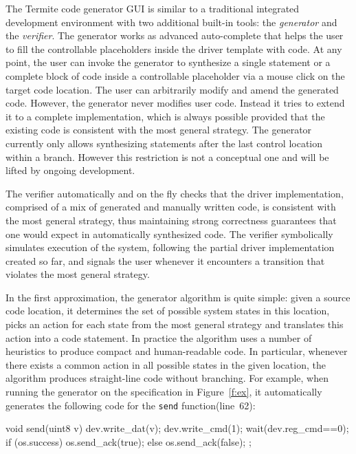 \documentclass[a4paper,twoside,openright,11pt]{book}
\newcommand{\termite}{Termite\xspace}
\theoremstyle{definition}
\newcommand{\src}[1]{\texttt{\small #1}}
\begin{document}
The \termite code generator GUI is similar to a traditional integrated development environment with two additional built-in tools: the \emph{generator} and the \emph{verifier}.  The generator works as advanced auto-complete that helps the user to fill the controllable placeholders inside the driver template with code.  At any point, the user can invoke the generator to synthesize a single statement or a complete block of code inside a controllable placeholder via a mouse click on the target code location.  The user can arbitrarily modify and amend the generated code.  However, the generator never modifies user code.  Instead it tries to extend it to a complete implementation, which is always possible provided that the existing code is consistent with the most general strategy.  The generator currently only allows synthesizing statements after the last control location within a branch.  However this restriction is not a conceptual one and will be lifted by ongoing development.

The verifier automatically and on the fly checks that the driver implementation, comprised of a mix of generated and manually written code, is consistent with the most general strategy, thus maintaining strong correctness guarantees that one would expect in automatically synthesized code.  The verifier symbolically simulates execution of the system, following the partial driver implementation created so far, and signals the user whenever it encounters a transition that violates the most general strategy.

In the first approximation, the generator algorithm is quite simple: given a source code location, it determines the set of possible system states in this location, picks an action for each state from the most general strategy and translates this action into a code statement.  In practice the algorithm uses a number of heuristics to produce compact and human-readable code.  In particular, whenever there exists a common action in all possible states in the given location, the algorithm produces straight-line code without branching.  For example, when running the generator on the specification in Figure~\ref{f:ex}, it automatically generates the following code for the \src{send} function(line~62):

\begin{tsllisting}[keywords=, frame=single]
void send(uint8 v){
    dev.write_dat(v);
    dev.write_cmd(1);
    wait(dev.reg_cmd==0);
    if (os.success) {
        os.send_ack(true);
    } else {
        os.send_ack(false);
    };}
\end{tsllisting}
\end{document}
